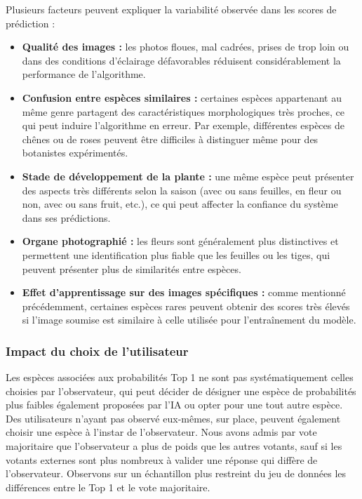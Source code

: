 \documentclass[a4paper,12pt]{article}
\begin{document}
Plusieurs facteurs peuvent expliquer la variabilité observée dans les scores de prédiction : 
\begin{itemize}
    \item \textbf{Qualité des images :} les photos floues, mal cadrées, prises de trop loin ou dans des conditions d'éclairage défavorables réduisent considérablement la performance de l'algorithme.
    \item \textbf{Confusion entre espèces similaires :} certaines espèces appartenant au même genre partagent des caractéristiques morphologiques très proches, ce qui peut induire l'algorithme en erreur. Par exemple, différentes espèces de chênes ou de roses peuvent être difficiles à distinguer même pour des botanistes expérimentés.
    \item \textbf{Stade de développement de la plante :} une même espèce peut présenter des aspects très différents selon la saison (avec ou sans feuilles, en fleur ou non, avec ou sans fruit, etc.), ce qui peut affecter la confiance du système dans ses prédictions.
    \item \textbf{Organe photographié :} les fleurs sont généralement plus distinctives et permettent une identification plus fiable que les feuilles ou les tiges, qui peuvent présenter plus de similarités entre espèces.
    \item \textbf{Effet d'apprentissage sur des images spécifiques :} comme mentionné précédemment, certaines espèces rares peuvent obtenir des scores très élevés si l'image soumise est similaire à celle utilisée pour l'entraînement du modèle.
\end{itemize}

\subsubsection{Impact du choix de l'utilisateur}

Les espèces associées aux probabilités Top 1 ne sont pas systématiquement celles choisies par l'observateur, qui peut décider de désigner une espèce de probabilités plus faibles également proposées par l'IA ou opter pour une tout autre espèce. Des utilisateurs n'ayant pas observé eux-mêmes, sur place, peuvent également choisir une espèce à l'instar de l'observateur. Nous avons admis par vote majoritaire que l'observateur a plus de poids que les autres votants, sauf si les votants externes sont plus nombreux à valider une réponse qui diffère de l'observateur. Observons sur un échantillon plus restreint du jeu de données les différences entre le Top 1 et le vote majoritaire. 
\end{document}
